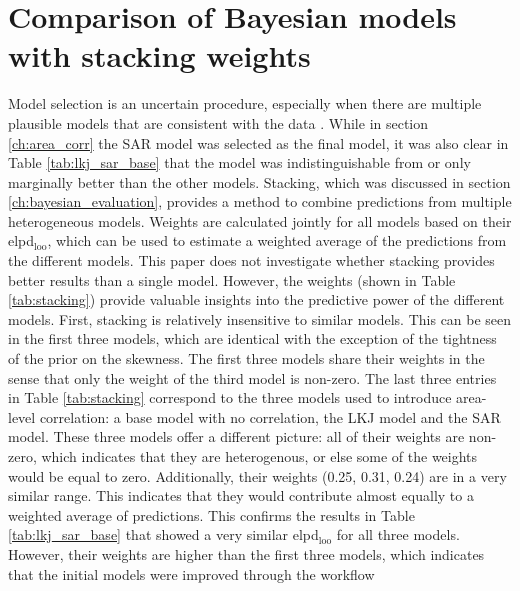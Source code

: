 \section{Comparison of Bayesian models with stacking weights}

Model selection is an uncertain procedure, especially when there are multiple plausible models that are consistent with the data \citep{gelman_bayesian_2020}.
While in section \ref{ch:area_corr} the SAR model was selected as the final model, it was also clear in Table \ref{tab:lkj_sar_base} that the model was indistinguishable from or only marginally better than the other models.
Stacking, which was discussed in section \ref{ch:bayesian_evaluation}, provides a method to combine predictions from multiple heterogeneous models.
Weights are calculated jointly for all models based on their elpd$_{\text{loo}}$, which can be used to estimate
a weighted average of the predictions from the different models.
This paper does not investigate whether stacking provides better results than a single model.
However, the weights (shown in Table \ref{tab:stacking}) provide valuable insights into the predictive power of the different models.
First, stacking is relatively insensitive to similar models.
This can be seen in the first three models, which are identical with the exception of the tightness of the prior on the skewness.
The first three models share their weights in the sense that only the weight of the third model is non-zero.
The last three entries in Table \ref{tab:stacking} correspond to the three models used to introduce area-level correlation: a base model with no correlation, the LKJ model and the SAR model.
These three models offer a different picture: all of their weights are non-zero, which indicates that they are heterogenous, or else some of the weights would be equal to zero.
Additionally, their weights (0.25, 0.31, 0.24) are in a very similar range.
This indicates that they would contribute almost equally to a weighted average of predictions.
This confirms the results in Table \ref{tab:lkj_sar_base} that showed a very similar elpd$_{\text{loo}}$ for all three models.
However, their weights are higher than the first three models, which indicates that the initial models were improved through the workflow

